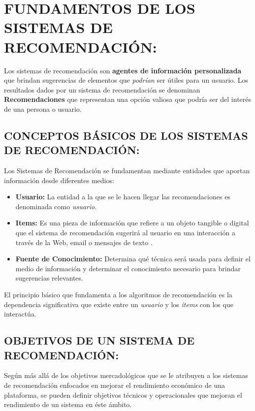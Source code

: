 \section{FUNDAMENTOS DE LOS SISTEMAS DE RECOMENDACIÓN: }

Los sistemas de recomendación son \textbf{agentes de información personalizada} que brindan sugerencias de elementos que \textit{podrían} ser útiles para un usuario.  Los resultados dados por un sistema de recomendación se denominan \textbf{Recomendaciones} que representan una opción valiosa que podría ser del interés de una persona o usuario.

\subsection{CONCEPTOS BÁSICOS DE LOS SISTEMAS DE RECOMENDACIÓN: }

Los Sistemas de Recomendación se fundamentan mediante entidades que aportan información desde diferentes medios:

\begin{itemize}
    \item \textbf{Usuario: } La entidad a la que se le hacen llegar las recomendaciones es denominada como \textit{usuario}. 
    \item \textbf{Items: } Es una pieza de información que refiere a un objeto tangible o digital que el sistema de recomendación sugerirá al usuario en una interacción a través de la Web, email o mensajes de texto \parencite{Kotkov2020Serendipity}.
    \item \textbf{Fuente de Conocimiento: } Determina qué técnica será usada para definir el medio de información y determinar el conocimiento necesario para brindar sugerencias relevantes.
\end{itemize}

El principio básico que fundamenta a los algoritmos de recomendación es la dependencia significativa que existe entre un \textit{usuario} y los \textit{items} con los que interactúa.

\newpage
\thispagestyle{plain}
\vspace*{0.2cm}

\subsection{OBJETIVOS DE UN SISTEMA DE RECOMENDACIÓN: }
Según \parencite{Aggarwal2016} más allá de los objetivos mercadológicos que se le atribuyen a los sistemas de recomendación enfocados en mejorar el rendimiento económico de una plataforma, se pueden definir objetivos técnicos y operacionales que mejoran el rendimiento de un sistema en éste ámbito.

